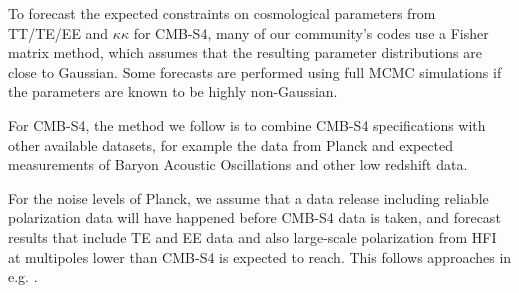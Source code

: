 To forecast the expected constraints on cosmological parameters from TT/TE/EE and $\kappa\kappa$ for CMB-S4, many of our community's codes use a Fisher matrix method, which assumes that the resulting parameter distributions are close to Gaussian.  Some forecasts are performed using full MCMC simulations if the parameters are known to be highly non-Gaussian. 

For CMB-S4, the method we follow is to combine CMB-S4 specifications with other available datasets, for example the data from Planck and expected measurements of Baryon Acoustic Oscillations and other low redshift data. 

For the noise levels of Planck, we assume that a data release including reliable polarization data will have happened before CMB-S4 data is taken, and forecast results that include TE and EE data and also large-scale polarization from HFI at multipoles lower than CMB-S4 is expected to reach. This follows approaches in e.g. \cite{allison/etal:2015}.

